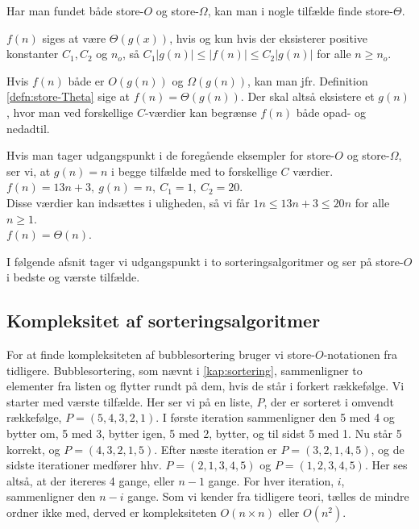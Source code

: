 Har man fundet både store-$O$ og store-$\Omega$, kan man i nogle tilfælde finde store-$\Theta$.
\begin{defn} \label{defn:store-Theta}
$f(n)$ siges at være $\Theta(g(x))$, hvis og kun hvis der eksisterer positive konstanter $C_1, C_2$ og $n_o$, så $C_1|g(n)| \leq |f(n)| \leq C_2|g(n)|$ for alle $n \geq n_o$.
\end{defn}
Hvis $f(n)$ både er $O(g(n))$ og $\Omega(g(n))$, kan man jfr. Definition \ref{defn:store-Theta} sige at $f(n) = \Theta(g(n))$. 
Der skal altså eksistere et $g(n)$, hvor man ved forskellige $C$-værdier kan begrænse $f(n)$ både opad- og nedadtil. 
\begin{exmp}
Hvis man tager udgangspunkt i de foregående eksempler for store-$O$ og store-$\Omega$, ser vi, at $g(n) = n$ i begge tilfælde med to forskellige $C$ værdier. \\
$f(n)=13n+3, \ g(n)=n, \ C_1=1, \ C_2=20$. \\
Disse værdier kan indsættes i uligheden, så vi får $1n \leq 13n+3 \leq 20n$ for alle $n \geq 1$. \\
$f(n)= \Theta(n)$.
\end{exmp}

I følgende afsnit tager vi udgangspunkt i to sorteringsalgoritmer og ser på store-$O$ i bedste og værste tilfælde.

\subsection{Kompleksitet af sorteringsalgoritmer} \label{kap:kompleksitet_sortering}

For at finde kompleksiteten af bubblesortering bruger vi store-$O$-notationen fra tidligere. 
Bubblesortering, som nævnt i \autoref{kap:sortering}, sammenligner to elementer fra listen og flytter rundt på dem, hvis de står i forkert rækkefølge.
Vi starter med værste tilfælde. Her ser vi på en liste, $P$, der er sorteret i omvendt rækkefølge, $P=(5,4,3,2,1)$.
I første iteration sammenligner den 5 med 4 og bytter om, 5 med 3, bytter igen, 5 med 2, bytter, og til sidst 5 med 1. Nu står 5 korrekt, og $P=(4, 3, 2, 1, 5)$.
Efter næste iteration er $P=(3, 2, 1, 4, 5)$, og de sidste iterationer medfører hhv. $P=(2, 1, 3, 4, 5)$ og $P=(1, 2, 3, 4, 5)$. Her ses altså, at der itereres 4 gange, eller $n-1$ gange. 
For hver iteration, $i$, sammenligner den $n-i$ gange. 
Som vi kender fra tidligere teori, tælles de mindre ordner ikke med, derved er kompleksiteten $O(n\times n)$ eller $O(n^2)$.

